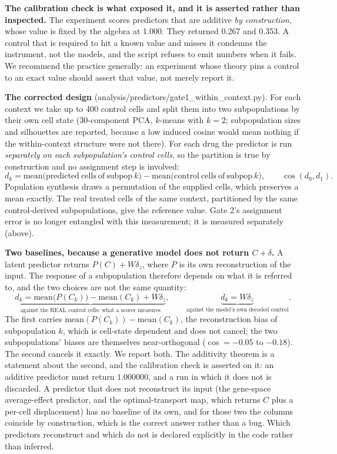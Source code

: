 \documentclass[11pt,letterpaper]{article}
\begin{document}
\textbf{The calibration check is what exposed it, and it is asserted rather than inspected.} The
experiment scores predictors that are additive \emph{by construction}, whose value is fixed by the
algebra at 1.000. They returned 0.267 and 0.353. A control that is required to hit a known value and
misses it condemns the instrument, not the models, and the script refuses to emit numbers when it
fails. We recommend the practice generally: an experiment whose theory pins a control to an exact
value should assert that value, not merely report it.

\textbf{The corrected design} (analysis/predictors/gate1\_within\_context.py). For each context we
take up to 400 control cells and split them into two subpopulations by their own cell state (30-component
PCA, $k$-means with $k=2$; subpopulation sizes and silhouettes are reported, because a low induced
cosine would mean nothing if the within-context structure were not there). For each drug the
predictor is run \emph{separately on each subpopulation's control cells}, so the partition is true
by construction and no assignment step is involved:
\[
d_k = \mathrm{mean}\big(\mathrm{predicted\ cells\ of\ subpop\ }k\big) -
      \mathrm{mean}\big(\mathrm{control\ cells\ of\ subpop\ }k\big), \qquad
\cos(d_0, d_1).
\]
Population synthesis draws a permutation of the supplied cells, which preserves a mean exactly. The
real treated cells of the same context, partitioned by the same control-derived subpopulations, give
the reference value. Gate 2's assignment error is no longer entangled with this measurement; it is
measured separately (above).

\textbf{Two baselines, because a generative model does not return $C + \delta$.} A latent predictor
returns $P(C) + W\delta_z$, where $P$ is its own reconstruction of the input. The response of a
subpopulation therefore depends on what it is referred to, and the two choices are not the same
quantity:
\[
\underbrace{d_k = \mathrm{mean}\big(P(C_k)\big) - \mathrm{mean}(C_k) + W\delta_z}_{\text{against the
REAL control cells: what a scorer measures}}, \qquad
\underbrace{d_k = W\delta_z}_{\text{against the model's own decoded control}} .
\]
The first carries $\mathrm{mean}(P(C_k)) - \mathrm{mean}(C_k)$, the reconstruction bias of
subpopulation $k$, which is cell-state dependent and does not cancel; the two subpopulations' biases are
themselves near-orthogonal ($\cos = -0.05$ to $-0.18$). The second cancels it exactly.
We report both. The additivity theorem is a statement about the second, and the calibration check is
asserted on it: an additive predictor must return $1.000000$, and a run in which it does not is
discarded. A predictor that does not reconstruct its input (the gene-space average-effect predictor,
and the optimal-transport map, which returns $C$ plus a per-cell displacement) has no baseline of its
own, and for those two the columns coincide by construction, which is the correct answer rather than
a bug. Which predictors reconstruct and which do not is declared explicitly in the code rather than
inferred.
\end{document}
